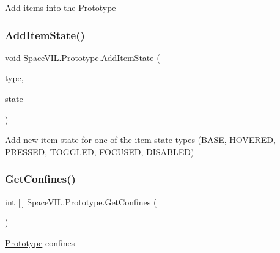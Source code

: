 Add items into the \mbox{\hyperlink{class_space_v_i_l_1_1_prototype}{Prototype}} 

\mbox{\label{class_space_v_i_l_1_1_prototype_abe7d58e0439b1ca3485ecb45683fdd12}} 
\subsubsection{\texorpdfstring{Add\+Item\+State()}{AddItemState()}}
{\footnotesize\ttfamily void Space\+V\+I\+L.\+Prototype.\+Add\+Item\+State (\begin{DoxyParamCaption}\item[{Item\+State\+Type}]{type,  }\item[{\mbox{\hyperlink{class_space_v_i_l_1_1_decorations_1_1_item_state}{Item\+State}}}]{state }\end{DoxyParamCaption})\hspace{0.3cm}{\ttfamily [inline]}}



Add new item state for one of the item state types (B\+A\+SE, H\+O\+V\+E\+R\+ED, P\+R\+E\+S\+S\+ED, T\+O\+G\+G\+L\+ED, F\+O\+C\+U\+S\+ED, D\+I\+S\+A\+B\+L\+ED) 

\mbox{\label{class_space_v_i_l_1_1_prototype_a5d6fa221e52785b78d1e3cd706a38abb}} 
\subsubsection{\texorpdfstring{Get\+Confines()}{GetConfines()}}
{\footnotesize\ttfamily int \mbox{[}$\,$\mbox{]} Space\+V\+I\+L.\+Prototype.\+Get\+Confines (\begin{DoxyParamCaption}{ }\end{DoxyParamCaption})\hspace{0.3cm}{\ttfamily [inline]}}



\mbox{\hyperlink{class_space_v_i_l_1_1_prototype}{Prototype}} confines 



